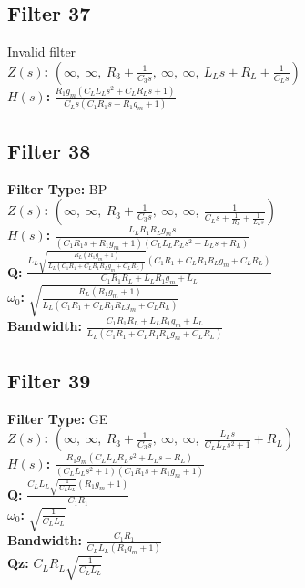 \documentclass{article}
\begin{document}
\subsection*{Filter 37}
Invalid filter \\ 
\textbf{$Z(s)$:} $\left( \infty, \  \infty, \  R_{3} + \frac{1}{C_{3} s}, \  \infty, \  \infty, \  L_{L} s + R_{L} + \frac{1}{C_{L} s}\right)$ \\ 
\textbf{$H(s)$:} $\frac{R_{1} g_{m} \left(C_{L} L_{L} s^{2} + C_{L} R_{L} s + 1\right)}{C_{L} s \left(C_{1} R_{1} s + R_{1} g_{m} + 1\right)}$ \\ 
\subsection*{Filter 38}
\textbf{Filter Type:} BP \\ 
\textbf{$Z(s)$:} $\left( \infty, \  \infty, \  R_{3} + \frac{1}{C_{3} s}, \  \infty, \  \infty, \  \frac{1}{C_{L} s + \frac{1}{R_{L}} + \frac{1}{L_{L} s}}\right)$ \\ 
\textbf{$H(s)$:} $\frac{L_{L} R_{1} R_{L} g_{m} s}{\left(C_{1} R_{1} s + R_{1} g_{m} + 1\right) \left(C_{L} L_{L} R_{L} s^{2} + L_{L} s + R_{L}\right)}$ \\ 
\textbf{Q:} $\frac{L_{L} \sqrt{\frac{R_{L} \left(R_{1} g_{m} + 1\right)}{L_{L} \left(C_{1} R_{1} + C_{L} R_{1} R_{L} g_{m} + C_{L} R_{L}\right)}} \left(C_{1} R_{1} + C_{L} R_{1} R_{L} g_{m} + C_{L} R_{L}\right)}{C_{1} R_{1} R_{L} + L_{L} R_{1} g_{m} + L_{L}}$ \\ 
\textbf{$\omega_0$:} $\sqrt{\frac{R_{L} \left(R_{1} g_{m} + 1\right)}{L_{L} \left(C_{1} R_{1} + C_{L} R_{1} R_{L} g_{m} + C_{L} R_{L}\right)}}$ \\ 
\textbf{Bandwidth:} $\frac{C_{1} R_{1} R_{L} + L_{L} R_{1} g_{m} + L_{L}}{L_{L} \left(C_{1} R_{1} + C_{L} R_{1} R_{L} g_{m} + C_{L} R_{L}\right)}$ \\ 
\subsection*{Filter 39}
\textbf{Filter Type:} GE \\ 
\textbf{$Z(s)$:} $\left( \infty, \  \infty, \  R_{3} + \frac{1}{C_{3} s}, \  \infty, \  \infty, \  \frac{L_{L} s}{C_{L} L_{L} s^{2} + 1} + R_{L}\right)$ \\ 
\textbf{$H(s)$:} $\frac{R_{1} g_{m} \left(C_{L} L_{L} R_{L} s^{2} + L_{L} s + R_{L}\right)}{\left(C_{L} L_{L} s^{2} + 1\right) \left(C_{1} R_{1} s + R_{1} g_{m} + 1\right)}$ \\ 
\textbf{Q:} $\frac{C_{L} L_{L} \sqrt{\frac{1}{C_{L} L_{L}}} \left(R_{1} g_{m} + 1\right)}{C_{1} R_{1}}$ \\ 
\textbf{$\omega_0$:} $\sqrt{\frac{1}{C_{L} L_{L}}}$ \\ 
\textbf{Bandwidth:} $\frac{C_{1} R_{1}}{C_{L} L_{L} \left(R_{1} g_{m} + 1\right)}$ \\ 
\textbf{Qz:} $C_{L} R_{L} \sqrt{\frac{1}{C_{L} L_{L}}}$ \\ 
\end{document}
